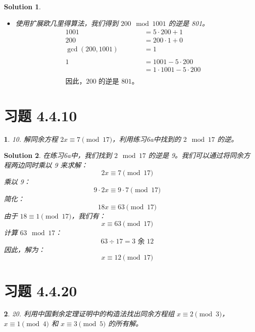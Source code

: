 \documentclass[UTF8]{report}
\newtheorem{solution}{Solution}
\theoremstyle{MyLineTheoremStyle} %
\theoremstyle{MyBlockTheoremStyle} %
\theoremstyle{MySubsubsectionStyle} %
\newtheorem{definition}{}
\begin{document}
\begin{solution}
\begin{itemize}
        \item[d)] 使用扩展欧几里得算法，我们得到 \( 200 \mod 1001 \) 的逆是 801。
        \[
        \begin{aligned}
            1001 &= 5 \cdot 200 + 1 \\
            200 &= 200 \cdot 1 + 0 \\
            \gcd(200, 1001) &= 1 \\
            \\
            1 &= 1001 - 5 \cdot 200 \\
            &= 1 \cdot 1001 - 5 \cdot 200 \\
            \\
            \text{因此，200 的逆是 801。}
        \end{aligned}
        \]
    \end{itemize}
\end{solution}




\section{习题 4.4.10}

\begin{definition}
    10. 解同余方程 \( 2x \equiv 7 \pmod{17} \)，利用练习6a中找到的 \( 2 \mod 17 \) 的逆。
\end{definition}

\begin{solution}
    在练习6a中，我们找到 \( 2 \mod 17 \) 的逆是 9。我们可以通过将同余方程两边同时乘以 9 来求解：
    \[
    2x \equiv 7 \pmod{17}
    \]
    乘以 9：
    \[
    9 \cdot 2x \equiv 9 \cdot 7 \pmod{17}
    \]
    简化：
    \[
    18x \equiv 63 \pmod{17}
    \]
    由于 \( 18 \equiv 1 \pmod{17} \)，我们有：
    \[
    x \equiv 63 \pmod{17}
    \]
    计算 \( 63 \mod 17 \)：
    \[
    63 \div 17 = 3 \text{ 余 } 12
    \]
    因此，解为：
    \[
    x \equiv 12 \pmod{17}
    \]
\end{solution}

\section{习题 4.4.20}

\begin{definition}
    20. 利用中国剩余定理证明中的构造法找出同余方程组 \( x \equiv 2 \pmod{3} \)，\( x \equiv 1 \pmod{4} \) 和 \( x \equiv 3 \pmod{5} \) 的所有解。
\end{definition}
\end{document}

